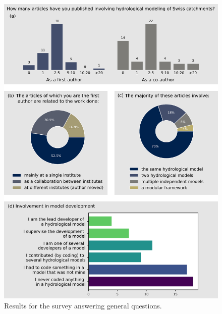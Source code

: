 \documentclass[10pt,a4paper]{article}
\begin{document}
\begin{figure}[htbp]
	\begin{center}
		\includegraphics[width=0.90\columnwidth]{figures/survey_general.pdf}
		\caption{{Results for the survey answering general questions.
		{\label{fig:survey_general}}
		}}
	\end{center}
\end{figure}
\end{document}
